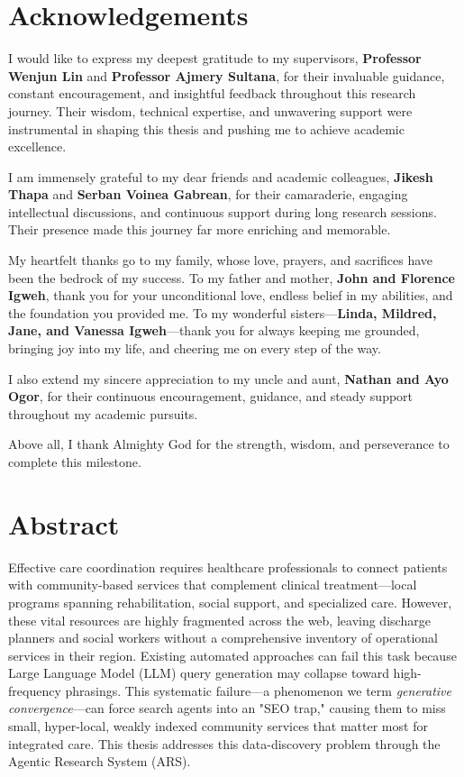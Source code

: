 \documentclass[12pt,oneside]{report}
\begin{document}
\newpage
\chapter*{Acknowledgements}

I would like to express my deepest gratitude to my supervisors, \textbf{Professor Wenjun Lin} and \textbf{Professor Ajmery Sultana}, for their invaluable guidance, constant encouragement, and insightful feedback throughout this research journey. Their wisdom, technical expertise, and unwavering support were instrumental in shaping this thesis and pushing me to achieve academic excellence.

I am immensely grateful to my dear friends and academic colleagues, \textbf{Jikesh Thapa} and \textbf{Serban Voinea Gabrean}, for their camaraderie, engaging intellectual discussions, and continuous support during long research sessions. Their presence made this journey far more enriching and memorable.

My heartfelt thanks go to my family, whose love, prayers, and sacrifices have been the bedrock of my success. To my father and mother, \textbf{John and Florence Igweh}, thank you for your unconditional love, endless belief in my abilities, and the foundation you provided me. To my wonderful sisters—\textbf{Linda, Mildred, Jane, and Vanessa Igweh}—thank you for always keeping me grounded, bringing joy into my life, and cheering me on every step of the way. 

I also extend my sincere appreciation to my uncle and aunt, \textbf{Nathan and Ayo Ogor}, for their continuous encouragement, guidance, and steady support throughout my academic pursuits.

Above all, I thank Almighty God for the strength, wisdom, and perseverance to complete this milestone.

\chapter*{Abstract}
Effective care coordination requires healthcare professionals to connect patients with community-based services that complement clinical treatment—local programs spanning rehabilitation, social support, and specialized care. However, these vital resources are highly fragmented across the web, leaving discharge planners and social workers without a comprehensive inventory of operational services in their region. Existing automated approaches can fail this task because Large Language Model (LLM) query generation may collapse toward high-frequency phrasings. This systematic failure—a phenomenon we term \textit{generative convergence}—can force search agents into an "SEO trap," causing them to miss small, hyper-local, weakly indexed community services that matter most for integrated care. This thesis addresses this data-discovery problem through the Agentic Research System (ARS).
\end{document}
